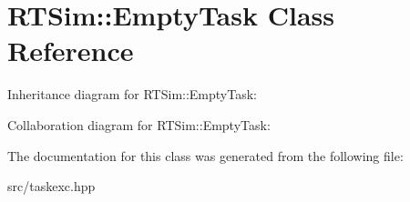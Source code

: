 \hypertarget{classRTSim_1_1EmptyTask}{}\section{R\+T\+Sim\+:\+:Empty\+Task Class Reference}
\label{classRTSim_1_1EmptyTask}


Inheritance diagram for R\+T\+Sim\+:\+:Empty\+Task\+:


Collaboration diagram for R\+T\+Sim\+:\+:Empty\+Task\+:


The documentation for this class was generated from the following file\+:\begin{DoxyCompactItemize}
\item 
src/taskexc.\+hpp\end{DoxyCompactItemize}
